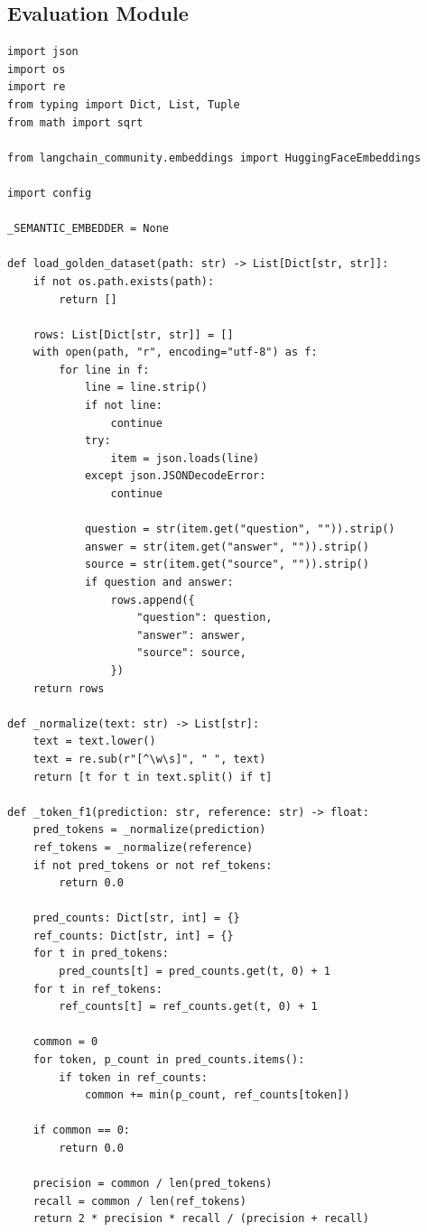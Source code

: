 \documentclass[12pt,a4paper]{article}
\begin{document}
\subsection*{Evaluation Module}
\begin{lstlisting}[caption={evaluation.py}]
import json
import os
import re
from typing import Dict, List, Tuple
from math import sqrt

from langchain_community.embeddings import HuggingFaceEmbeddings

import config

_SEMANTIC_EMBEDDER = None

def load_golden_dataset(path: str) -> List[Dict[str, str]]:
    if not os.path.exists(path):
        return []

    rows: List[Dict[str, str]] = []
    with open(path, "r", encoding="utf-8") as f:
        for line in f:
            line = line.strip()
            if not line:
                continue
            try:
                item = json.loads(line)
            except json.JSONDecodeError:
                continue

            question = str(item.get("question", "")).strip()
            answer = str(item.get("answer", "")).strip()
            source = str(item.get("source", "")).strip()
            if question and answer:
                rows.append({
                    "question": question,
                    "answer": answer,
                    "source": source,
                })
    return rows

def _normalize(text: str) -> List[str]:
    text = text.lower()
    text = re.sub(r"[^\w\s]", " ", text)
    return [t for t in text.split() if t]

def _token_f1(prediction: str, reference: str) -> float:
    pred_tokens = _normalize(prediction)
    ref_tokens = _normalize(reference)
    if not pred_tokens or not ref_tokens:
        return 0.0

    pred_counts: Dict[str, int] = {}
    ref_counts: Dict[str, int] = {}
    for t in pred_tokens:
        pred_counts[t] = pred_counts.get(t, 0) + 1
    for t in ref_tokens:
        ref_counts[t] = ref_counts.get(t, 0) + 1

    common = 0
    for token, p_count in pred_counts.items():
        if token in ref_counts:
            common += min(p_count, ref_counts[token])

    if common == 0:
        return 0.0

    precision = common / len(pred_tokens)
    recall = common / len(ref_tokens)
    return 2 * precision * recall / (precision + recall)


\end{lstlisting}
\end{document}

